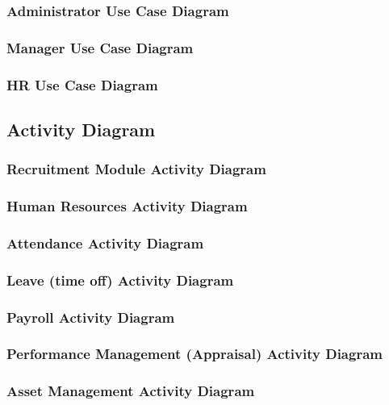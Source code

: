 \subsubsection{Administrator Use Case Diagram}

\subsubsection{Manager Use Case Diagram}

\subsubsection{HR Use Case Diagram}

\subsection{Activity Diagram}

\subsubsection{Recruitment Module Activity Diagram}

\subsubsection{Human Resources Activity Diagram}

\subsubsection{Attendance Activity Diagram}

\subsubsection{Leave (time off) Activity Diagram}

\subsubsection{Payroll Activity Diagram}

\subsubsection{Performance Management (Appraisal) Activity Diagram}

\subsubsection{Asset Management Activity Diagram}


